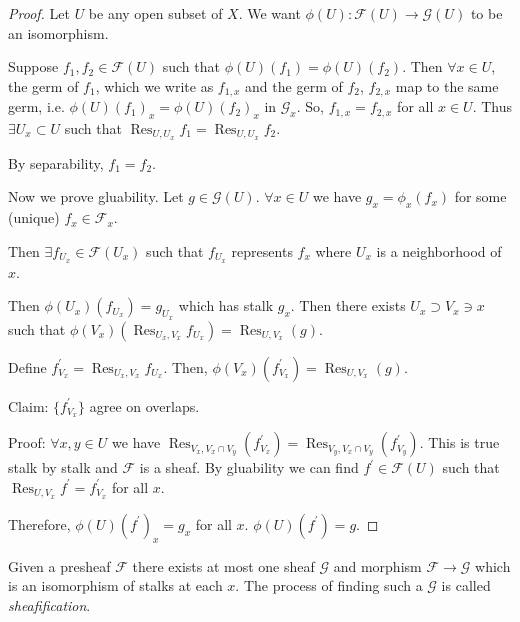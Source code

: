 \documentclass{article}
\theoremstyle{definition}
\begin{document}
    \begin{proof}

        Let \(U\) be any open subset of \(X\). We want \(\phi(U): \mathcal{F}(U) \to \mathcal{G}(U)\) to be an isomorphism.

        Suppose \(f_1, f_2\in \mathcal{F}(U)\) such that \(\phi(U)(f_1) = \phi(U)(f_2)\). Then \(\forall x\in U\), the germ of \(f_1\), which we write as \(f_{1,x}\) and the germ of \(f_2\), \(f_{2,x}\) map to the same germ, i.e. \(\phi(U)(f_1)_x = \phi(U)(f_2)_x\) in \(\mathcal{G}_x\). So, \(f_{1,x} = f_{2,x}\) for all \(x\in U\). Thus \(\exists U_x \subset U\) such that \(\operatorname{Res}_{U,U_x} f_1 = \operatorname{Res}_{U,U_x} f_2\).

        By separability, \(f_1 = f_2\).

        Now we prove gluability. Let \(g\in \mathcal{G}(U)\). \(\forall x\in U\) we have \(g_x = \phi_x(f_x)\) for some (unique) \(f_x \in \mathcal{F}_x\).

        Then \(\exists f_{U_x} \in \mathcal{F}(U_x)\) such that \(f_{U_x}\) represents \(f_x\) where \(U_x\) is a neighborhood of \(x\).

        Then \(\phi(U_x)(f_{U_x}) = g_{U_x}\) which has stalk \(g_x\). Then there exists \(U_x \supset V_x \ni x\) such that \(\phi(V_x)(\operatorname{Res}_{U_x, V_x}f_{U_x}) = \operatorname{Res}_{U,V_x}(g)\).
        
        Define \(f_{V_x}^{\prime} = \operatorname{Res}_{U_x, V_x} f_{U_x}\). Then, \(\phi(V_x)(f^{\prime} _{V_x}) = \operatorname{Res}_{U, V_x} (g)\).

        Claim: \(\{ f^{\prime}_{V_x} \}\) agree on overlaps.

        Proof: \(\forall x,y\in U\) we have \(\operatorname{Res}_{V_x, V_x\cap V_y} (f^{\prime} _{V_x}) = \operatorname{Res}_{V_y, V_x\cap V_y}(f^{\prime}_{V_y})\). This is true stalk by stalk and \(\mathcal{F}\) is a sheaf. By gluability we can find \(f^{\prime} \in \mathcal{F}(U)\) such that \(\operatorname{Res}_{U,V_x} f^{\prime} = f^{\prime} _{V_x}\) for all \(x\).

        Therefore, \(\phi(U)(f^{\prime})_x = g_x\) for all \(x\). \(\phi(U)(f^{\prime}) = g\).

    \end{proof}

    Given a presheaf \(\mathcal{F}\) there exists at most one sheaf \(\mathcal{G}\) and morphism \(\mathcal{F} \to \mathcal{G}\) which is an isomorphism of stalks at each \(x\). The process of finding such a \(\mathcal{G}\) is called \textit{sheafification}.
\end{document}
